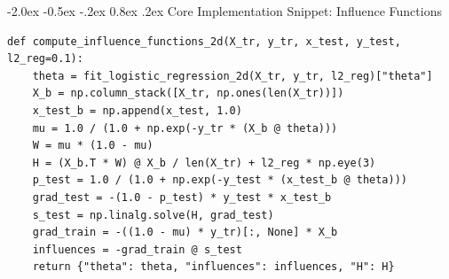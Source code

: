 \documentclass[12pt,a4paper]{report}
\makeatletter
\renewcommand\section{\@startsection {section}{1}{\z@}%
                                   {-2.0ex \@plus -0.5ex \@minus -.2ex}%
                                   {0.8ex \@plus.2ex}%
                                   {\normalfont\fontsize{14}{17}\bfseries\color{headerblue}}}
\makeatother
\begin{document}
\section{Core Implementation Snippet: Influence Functions}
\begin{verbatim}
def compute_influence_functions_2d(X_tr, y_tr, x_test, y_test, l2_reg=0.1):
    theta = fit_logistic_regression_2d(X_tr, y_tr, l2_reg)["theta"]
    X_b = np.column_stack([X_tr, np.ones(len(X_tr))])
    x_test_b = np.append(x_test, 1.0)
    mu = 1.0 / (1.0 + np.exp(-y_tr * (X_b @ theta)))
    W = mu * (1.0 - mu)
    H = (X_b.T * W) @ X_b / len(X_tr) + l2_reg * np.eye(3)
    p_test = 1.0 / (1.0 + np.exp(-y_test * (x_test_b @ theta)))
    grad_test = -(1.0 - p_test) * y_test * x_test_b
    s_test = np.linalg.solve(H, grad_test)
    grad_train = -((1.0 - mu) * y_tr)[:, None] * X_b
    influences = -grad_train @ s_test
    return {"theta": theta, "influences": influences, "H": H}
\end{verbatim}
\end{document}
